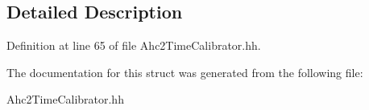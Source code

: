 \subsection{Detailed Description}


Definition at line 65 of file Ahc2\-Time\-Calibrator.\-hh.



The documentation for this struct was generated from the following file\-:\begin{DoxyCompactItemize}
\item 
Ahc2\-Time\-Calibrator.\-hh\end{DoxyCompactItemize}
